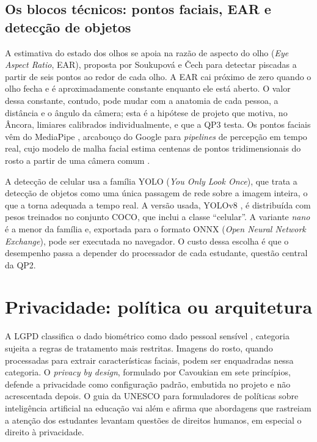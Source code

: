 \documentclass[portuguese,oneside]{tcc}
\newcommand{\ferramenta}{Âncora\xspace}
\newcommand{\estr}[1]{\emph{#1}}
\begin{document}
\subsection{Os blocos técnicos: pontos faciais, EAR e detecção de objetos}

A estimativa do estado dos olhos se apoia na razão de aspecto do olho (\estr{Eye Aspect Ratio}, EAR), proposta por Soukupová e Čech \cite{SC16} para detectar piscadas a partir de seis pontos ao redor de cada olho. A EAR cai próximo de zero quando o olho fecha e é aproximadamente constante enquanto ele está aberto. O valor dessa constante, contudo, pode mudar com a anatomia de cada pessoa, a distância e o ângulo da câmera; esta é a hipótese de projeto que motiva, no \ferramenta, limiares calibrados individualmente, e que a QP3 testa. Os pontos faciais vêm do MediaPipe \cite{LTN19}, arcabouço do Google para \estr{pipelines} de percepção em tempo real, cujo modelo de malha facial estima centenas de pontos tridimensionais do rosto a partir de uma câmera comum \cite{KAGG19}.

A detecção de celular usa a família YOLO (\estr{You Only Look Once}), que trata a detecção de objetos como uma única passagem de rede sobre a imagem inteira, o que a torna adequada a tempo real. A versão usada, YOLOv8 \cite{JCQ23}, é distribuída com pesos treinados no conjunto COCO, que inclui a classe ``celular''. A variante \estr{nano} é a menor da família e, exportada para o formato ONNX (\estr{Open Neural Network Exchange}), pode ser executada no navegador. O custo dessa escolha é que o desempenho passa a depender do processador de cada estudante, questão central da QP2.

\section{\label{sec:privacidade}Privacidade: política ou arquitetura}

A LGPD classifica o dado biométrico como dado pessoal sensível \cite{Bra18}, categoria sujeita a regras de tratamento mais restritas. Imagens do rosto, quando processadas para extrair características faciais, podem ser enquadradas nessa categoria. O \estr{privacy by design}, formulado por Cavoukian \cite{Cav09} em sete princípios, defende a privacidade como configuração padrão, embutida no projeto e não acrescentada depois. O guia da UNESCO para formuladores de políticas sobre inteligência artificial na educação \cite{UNE21} vai além e afirma que abordagens que rastreiam a atenção dos estudantes levantam questões de direitos humanos, em especial o direito à privacidade.
\end{document}
